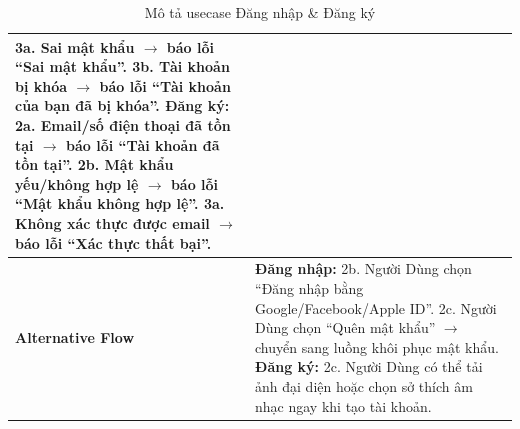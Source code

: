 \documentclass[a4paper]{article}
\begin{document}
\begin{table}[h!]
\begin{tabularx}{\textwidth}{|l|X|}
  3a. Sai mật khẩu $\rightarrow$ báo lỗi “Sai mật khẩu”. \newline
  3b. Tài khoản bị khóa $\rightarrow$ báo lỗi “Tài khoản của bạn đã bị khóa”.
  \textbf{Đăng ký:} \newline
  2a. Email/số điện thoại đã tồn tại $\rightarrow$ báo lỗi “Tài khoản đã tồn tại”. \newline
  2b. Mật khẩu yếu/không hợp lệ $\rightarrow$ báo lỗi “Mật khẩu không hợp lệ”. \newline
  3a. Không xác thực được email $\rightarrow$ báo lỗi “Xác thực thất bại”. \\ \hline
\textbf{Alternative Flow} 
& \textbf{Đăng nhập:} \newline
  2b. Người Dùng chọn “Đăng nhập bằng Google/Facebook/Apple ID”. \newline
  2c. Người Dùng chọn “Quên mật khẩu” $\rightarrow$ chuyển sang luồng khôi phục mật khẩu. \newline
  \textbf{Đăng ký:} \newline
  2c. Người Dùng có thể tải ảnh đại diện hoặc chọn sở thích âm nhạc ngay khi tạo tài khoản. \\ \hline
\end{tabularx}
\caption{Mô tả usecase Đăng nhập \& Đăng ký}
\end{table}
\end{document}
